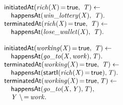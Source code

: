 \documentclass[8pt]{beamer}
\DeclareMathOperator{\val}{=}  %
\def \patsize {}
\def\happensAt{\textsf{\patsize happensAt}}
\def\initiatedAt{\textsf{\patsize initiatedAt}}
\def\terminatedAt{\textsf{\patsize terminatedAt}}
\def\startI{\textsf{\patsize startI}}
\def\true{\textsf{\patsize true}}
\newenvironment{mysplit}%
  {\arraycolsep 0pt \begin{array}{l}}%
  {\end{array}}
\begin{document}
\begin{frame}
\begin{minipage}{0.48\linewidth}
        \begin{align*}
            \begin{mysplit}
                \initiatedAt\mathit{(rich(X)\val\true,\ T) \leftarrow}\\
                \quad    \happensAt\mathit{(win\_lottery(X),\ T).}\\
                \terminatedAt\mathit{(rich(X)\val\true,\ T) \leftarrow}\\
                \quad    \happensAt\mathit{(lose\_wallet(X),\ T)}.\\\\
                \initiatedAt\mathit{(working(X)\val\true,\ T)\leftarrow}\\
                \quad    \happensAt\mathit{(go\_to(X,work),T)}.\\
                \terminatedAt\mathit{(working(X)\val\true,\ T) \leftarrow}\\
                \quad    \happensAt\mathit{(\startI(rich(X)\val\true),T)}.\\
                \terminatedAt\mathit{(working(X)\val\true,T)\leftarrow}\\
                \quad    \happensAt\mathit{(go\_to(X,Y),T)},\\
                \quad	 \mathit{Y\ \backslash\val work}.\\
            \end{mysplit}
        \end{align*}
    \end{minipage}

\end{frame}
\end{document}
